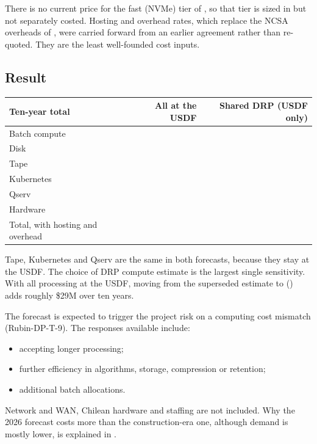 There is no current price for the fast (NVMe) tier of , so
that tier is sized in  but not separately costed. Hosting
and overhead rates, which replace the NCSA overheads of
, were carried forward from an earlier agreement
rather than re-quoted. They are the least well-founded cost inputs.

\subsection{Result}

\begin{center}
\begin{tabular}{lrr}
\hline
Ten-year total & All at the USDF & Shared DRP (USDF only) \\
\hline
Batch compute & \smTenYearBatch{} & \smSplitTenYearBatch{} \\
Disk & \smTenYearDisk{} & \smSplitTenYearDisk{} \\
Tape & \smTenYearTape{} & \smTenYearTape{} \\
Kubernetes & \smTenYearKeights{} & \smTenYearKeights{} \\
Qserv & \smTenYearQserv{} & \smTenYearQserv{} \\
\hline
Hardware & \smTenYearHardware{} & \smSplitTenYearHardware{} \\
Total, with hosting and overhead & \smTenYearTotal{} & \smSplitTenYearTotal{} \\
\hline
\end{tabular}
\end{center}

Tape, Kubernetes and Qserv are the same in both forecasts, because they stay
at the USDF. The choice of DRP compute estimate is the largest single
sensitivity. With all processing at the USDF, moving from the superseded
\wfortyone{} estimate to \vthirty{} () adds roughly
\$29M over ten years.

The forecast is expected to trigger the project risk on a computing cost
mismatch (Rubin-DP-T-9). The responses available include:
\begin{itemize}
\item accepting longer processing;
\item further efficiency in algorithms, storage, compression or retention;
\item additional batch allocations.
\end{itemize}
Network and WAN, Chilean hardware and staffing are not included. Why the 2026
forecast costs more than the construction-era one, although demand is mostly
lower, is explained in .



\begin{landscape}


\end{landscape}
